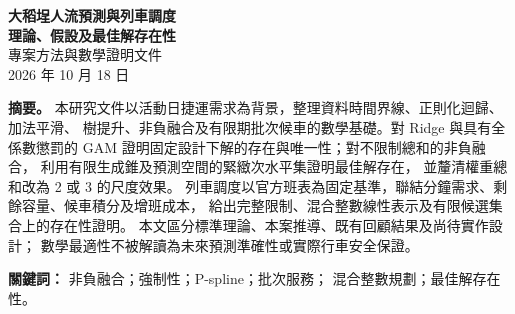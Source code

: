 \documentclass[a4paper,11pt]{article}
\theoremstyle{chinese}
\numberwithin{equation}{section}
\begin{document}
\begin{center}
{\LARGE\sffamily\bfseries 大稻埕人流預測與列車調度}\\[5pt]
{\Large\sffamily\bfseries 理論、假設及最佳解存在性}\\[8pt]
專案方法與數學證明文件\\
2026 年 10 月 18 日
\end{center}
\vspace{4pt}
\noindent\textbf{摘要。}
本研究文件以活動日捷運需求為背景，整理資料時間界線、正則化迴歸、加法平滑、
樹提升、非負融合及有限期批次候車的數學基礎。對 Ridge 與具有全係數懲罰的
GAM 證明固定設計下解的存在與唯一性；對不限制總和的非負融合，
利用有限生成錐及預測空間的緊緻次水平集證明最佳解存在，
並釐清權重總和改為 2 或 3 的尺度效果。
列車調度以官方班表為固定基準，聯結分鐘需求、剩餘容量、候車積分及增班成本，
給出完整限制、混合整數線性表示及有限候選集合上的存在性證明。
本文區分標準理論、本案推導、既有回顧結果及尚待實作設計；
數學最適性不被解讀為未來預測準確性或實際行車安全保證。

\noindent\textbf{關鍵詞：} 非負融合；強制性；P-spline；批次服務；
混合整數規劃；最佳解存在性。





\end{document}
